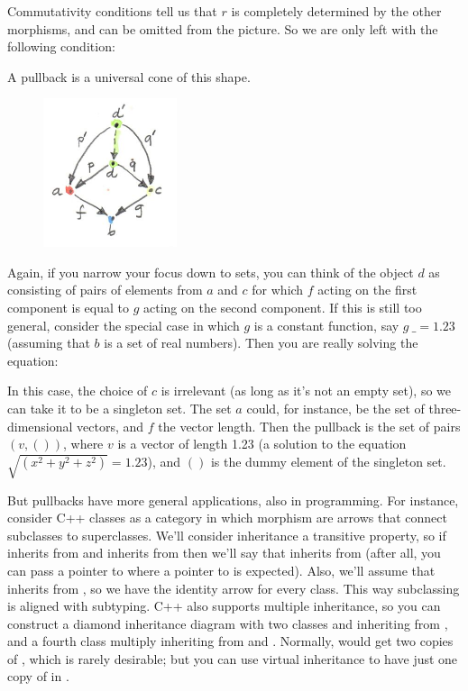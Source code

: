 \noindent
Commutativity conditions tell us that $r$ is completely
determined by the other morphisms, and can be omitted from the picture.
So we are only left with the following condition:

A pullback is a universal cone of this shape.

\begin{figure}[H]
\centering
\includegraphics[width=0.35\textwidth]{images/pullbacklimit.jpg}
\end{figure}

\noindent
Again, if you narrow your focus down to sets, you can think of the
object $d$ as consisting of pairs of elements from $a$ and
$c$ for which $f$ acting on the first component is equal
to $g$ acting on the second component. If this is still too
general, consider the special case in which $g$ is a constant
function, say $g~\_ = 1.23$ (assuming that $b$ is a set
of real numbers). Then you are really solving the equation:


In this case, the choice of $c$ is irrelevant (as long as it's
not an empty set), so we can take it to be a singleton set. The set
$a$ could, for instance, be the set of three-dimensional vectors,
and $f$ the vector length. Then the pullback is the set of pairs
$(v, ())$, where $v$ is a vector of length 1.23 (a
solution to the equation $\sqrt{(x^{2}+y^{2}+z^{2})} = 1.23$), and
$()$ is the dummy element of the singleton set.

But pullbacks have more general applications, also in programming. For
instance, consider C++ classes as a category in which morphism are
arrows that connect subclasses to superclasses. We'll consider
inheritance a transitive property, so if  inherits from  and 
inherits from  then we'll say that  inherits from  (after all, you
can pass a pointer to  where a pointer to  is expected). Also, we'll
assume that  inherits from , so we have the identity arrow for every
class. This way subclassing is aligned with subtyping. C++ also supports
multiple inheritance, so you can construct a diamond inheritance diagram
with two classes  and  inheriting from , and a fourth class 
multiply inheriting from  and . Normally,  would get two copies of ,
which is rarely desirable; but you can use virtual inheritance to have
just one copy of  in .


